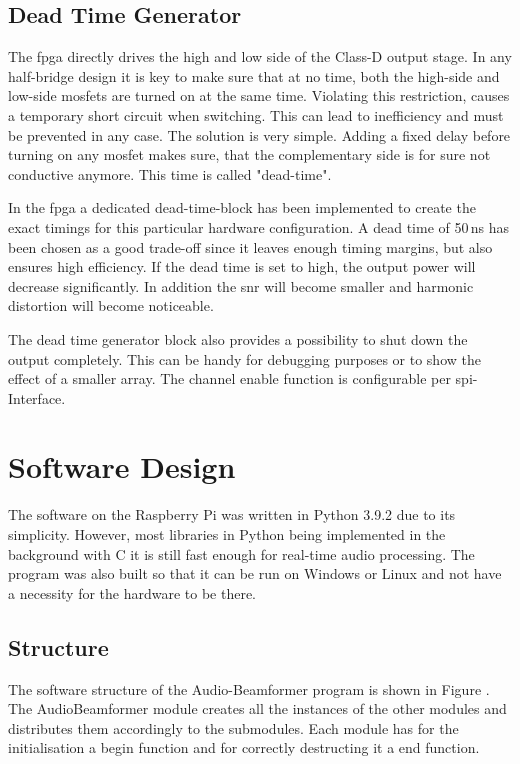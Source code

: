 
\subsection{Dead Time Generator}
The \acrshort{fpga} directly drives the high and low side of the Class-D output stage. In any half-bridge design it is key to make sure that at no time, both the high-side and low-side \acrshort{mosfet}s are turned on at the same time. Violating this restriction, causes a temporary short circuit when switching. This can lead to inefficiency and must be prevented in any case. The solution is very simple. Adding a fixed delay before turning on any \acrshort{mosfet} makes sure, that the complementary side is for sure not conductive anymore. This time is called "dead-time".

In the \acrshort{fpga} a dedicated dead-time-block has been implemented to create the exact timings for this particular hardware configuration. A dead time of 50\,ns has been chosen as a good trade-off since it leaves enough timing margins, but also ensures high efficiency. If the dead time is set to high, the output power will decrease significantly. In addition the \acrshort{snr} will become smaller and harmonic distortion will become noticeable.

The dead time generator block also provides a possibility to shut down the output completely. This can be handy for debugging purposes or to show the effect of a smaller array. The channel enable function is configurable per \acrshort{spi}-Interface.


\newpage
\section{Software Design}
The software on the Raspberry Pi was written in Python 3.9.2 due to its simplicity. However,  most libraries in Python being implemented in the background with C it is still fast enough for real-time audio processing.
The program was also built so that it can be run on Windows or Linux and not have a necessity for the hardware to be there.
\subsection{Structure}
The software structure of the Audio-Beamformer program is shown in Figure . The AudioBeamformer module creates all the instances of the other modules and distributes them accordingly to the submodules. Each module has for the initialisation a begin function and for correctly destructing it a end function. 


